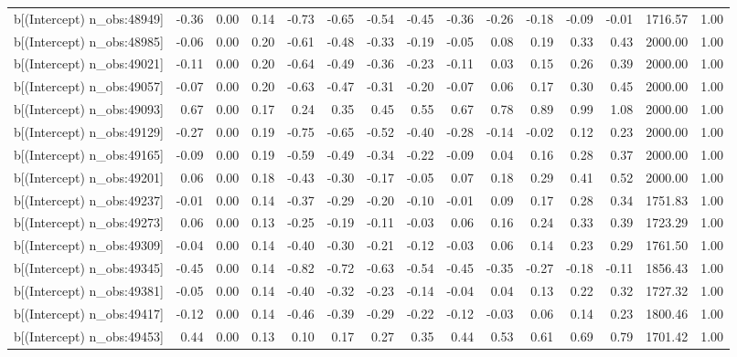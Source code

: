 \begin{table}[ht]
\begin{tabular}{rrrrrrrrrrrrrrr}
  b[(Intercept) n\_obs:48949] & -0.36 & 0.00 & 0.14 & -0.73 & -0.65 & -0.54 & -0.45 & -0.36 & -0.26 & -0.18 & -0.09 & -0.01 & 1716.57 & 1.00 \\ 
  b[(Intercept) n\_obs:48985] & -0.06 & 0.00 & 0.20 & -0.61 & -0.48 & -0.33 & -0.19 & -0.05 & 0.08 & 0.19 & 0.33 & 0.43 & 2000.00 & 1.00 \\ 
  b[(Intercept) n\_obs:49021] & -0.11 & 0.00 & 0.20 & -0.64 & -0.49 & -0.36 & -0.23 & -0.11 & 0.03 & 0.15 & 0.26 & 0.39 & 2000.00 & 1.00 \\ 
  b[(Intercept) n\_obs:49057] & -0.07 & 0.00 & 0.20 & -0.63 & -0.47 & -0.31 & -0.20 & -0.07 & 0.06 & 0.17 & 0.30 & 0.45 & 2000.00 & 1.00 \\ 
  b[(Intercept) n\_obs:49093] & 0.67 & 0.00 & 0.17 & 0.24 & 0.35 & 0.45 & 0.55 & 0.67 & 0.78 & 0.89 & 0.99 & 1.08 & 2000.00 & 1.00 \\ 
  b[(Intercept) n\_obs:49129] & -0.27 & 0.00 & 0.19 & -0.75 & -0.65 & -0.52 & -0.40 & -0.28 & -0.14 & -0.02 & 0.12 & 0.23 & 2000.00 & 1.00 \\ 
  b[(Intercept) n\_obs:49165] & -0.09 & 0.00 & 0.19 & -0.59 & -0.49 & -0.34 & -0.22 & -0.09 & 0.04 & 0.16 & 0.28 & 0.37 & 2000.00 & 1.00 \\ 
  b[(Intercept) n\_obs:49201] & 0.06 & 0.00 & 0.18 & -0.43 & -0.30 & -0.17 & -0.05 & 0.07 & 0.18 & 0.29 & 0.41 & 0.52 & 2000.00 & 1.00 \\ 
  b[(Intercept) n\_obs:49237] & -0.01 & 0.00 & 0.14 & -0.37 & -0.29 & -0.20 & -0.10 & -0.01 & 0.09 & 0.17 & 0.28 & 0.34 & 1751.83 & 1.00 \\ 
  b[(Intercept) n\_obs:49273] & 0.06 & 0.00 & 0.13 & -0.25 & -0.19 & -0.11 & -0.03 & 0.06 & 0.16 & 0.24 & 0.33 & 0.39 & 1723.29 & 1.00 \\ 
  b[(Intercept) n\_obs:49309] & -0.04 & 0.00 & 0.14 & -0.40 & -0.30 & -0.21 & -0.12 & -0.03 & 0.06 & 0.14 & 0.23 & 0.29 & 1761.50 & 1.00 \\ 
  b[(Intercept) n\_obs:49345] & -0.45 & 0.00 & 0.14 & -0.82 & -0.72 & -0.63 & -0.54 & -0.45 & -0.35 & -0.27 & -0.18 & -0.11 & 1856.43 & 1.00 \\ 
  b[(Intercept) n\_obs:49381] & -0.05 & 0.00 & 0.14 & -0.40 & -0.32 & -0.23 & -0.14 & -0.04 & 0.04 & 0.13 & 0.22 & 0.32 & 1727.32 & 1.00 \\ 
  b[(Intercept) n\_obs:49417] & -0.12 & 0.00 & 0.14 & -0.46 & -0.39 & -0.29 & -0.22 & -0.12 & -0.03 & 0.06 & 0.14 & 0.23 & 1800.46 & 1.00 \\ 
  b[(Intercept) n\_obs:49453] & 0.44 & 0.00 & 0.13 & 0.10 & 0.17 & 0.27 & 0.35 & 0.44 & 0.53 & 0.61 & 0.69 & 0.79 & 1701.42 & 1.00 \\ 

\end{tabular}
\end{table}
